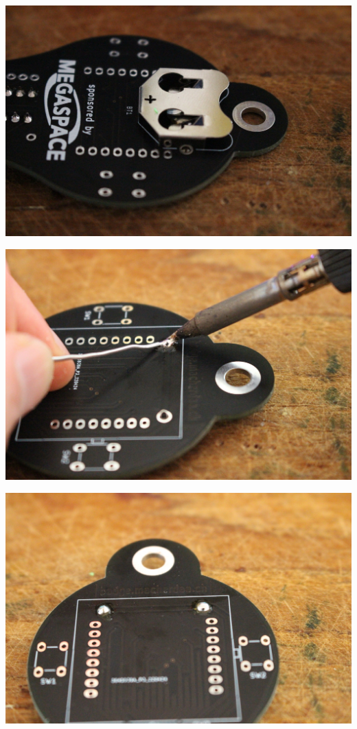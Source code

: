 \documentclass{article}
\begin{document}
\begin{minipage}[b]{0.5\textwidth}
	\includegraphics[width=\textwidth]{Bilder2022/IMG_8209.JPG}
\end{minipage}
\begin{minipage}[b]{0.5\textwidth}
	\includegraphics[width=\textwidth]{Bilder2022/IMG_8211.JPG}
\end{minipage}

\vspace{0.5cm}

\begin{minipage}[b]{0.5\textwidth}
	\includegraphics[width=\textwidth]{Bilder2022/IMG_8215.JPG}
\end{minipage}
\end{document}
